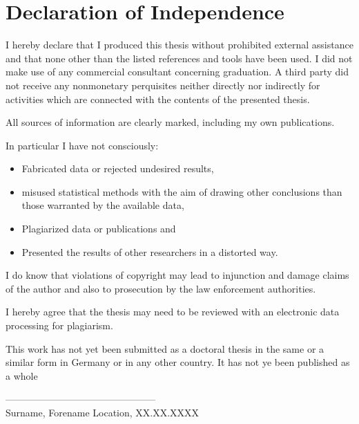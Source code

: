 \section*{Declaration of Independence}%
I hereby declare that I produced this thesis without prohibited external assistance and that none other than the listed references and tools have been used. I did not make use of any commercial consultant concerning graduation. A third party did not receive any nonmonetary perquisites neither directly nor indirectly for activities which are connected with the contents of the presented thesis.

All sources of information are clearly marked, including my own publications.

In particular I have not consciously:%
\begin{itemize}%
	\item Fabricated data or rejected undesired results,%
	\item misused statistical methods with the aim of drawing other conclusions than those warranted by the available data,%
	\item Plagiarized data or publications and%
	\item Presented the results of other researchers in a distorted way.%
\end{itemize}%
I do know that violations of copyright may lead to injunction and damage claims of the author and also to prosecution by the law enforcement authorities.

I hereby agree that the thesis may need to be reviewed with an electronic data processing for plagiarism.

This work has not yet been submitted as a doctoral thesis in the same or a similar form in Germany or in any other country. It has not ye been published as a whole
\vspace{1cm}%
\begin{flushleft}%
-----------------------------------------------\\%
Surname, Forename%
\hfill%
Location, XX.XX.XXXX%
\end{flushleft}%
